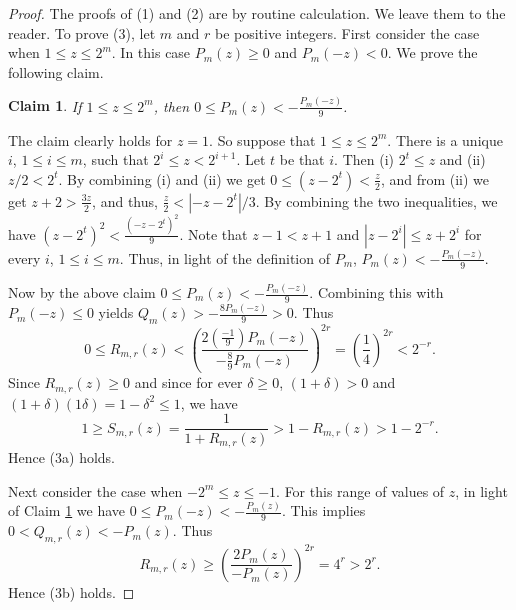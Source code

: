 \documentclass{amsbook}
\newtheorem{claim}[theorem]{Claim}
\theoremstyle{definition}
\theoremstyle{remark}
\numberwithin{section}{chapter}
\numberwithin{equation}{chapter}
\begin{document}
\begin{proof}
The proofs of (1) and (2) are by routine calculation. We leave them to the reader. To prove (3), let $m$ and $r$ be positive integers. First consider the case when $1\leq z\leq 2^m$. In this case $P_m(z)\geq 0$ and $P_m(-z)<0$. We prove the following claim.
\begin{claim}\label{plclaim1}
If $1\leq z\leq 2^m$, then  $0\leq P_m(z)<-\frac{P_m(-z)}{9}$.
\end{claim}
\begin{cproof}
The claim clearly holds for $z=1$. So suppose that $1\leq z\leq 2^m$. There is a unique $i$, $1\leq i\leq m$, such that $2^i\leq z<2^{i+1}$. Let $t$ be that $i$. Then (i) $2^t\leq z$ and (ii) $z/2<2^t$. By combining (i) and (ii) we get $0\leq (z-2^t)<\frac{z}{2}$, and from (ii) we get $z+2>\frac{3z}{2}$, and thus, $\frac{z}{2}<|-z-2^t|/3$. By combining the two inequalities, we have $(z-2^t)^2<\frac{(-z-2^t)^2}{9}$. Note that $z-1<z+1$ and $|z-2^i|\leq z+2^i$ for every $i$, $1\leq i\leq m$. Thus, in light of the definition of $P_m$, $P_m(z)<-\frac{P_m(-z)}{9}$.
\end{cproof}

Now by the above claim $0\leq P_m(z)<-\frac{P_m(-z)}{9}$. Combining this with $P_m(-z)\leq 0$ yields $Q_m(z)>-\frac{8P_m(-z)}{9}>0$. Thus
\[
0\leq R_{m,r}(z)<\left(\frac{2\left(\frac{-1}{9}\right)P_m(-z)}{-\frac{8}{9}P_m(-z)}\right)^{2r}=\left(\frac{1}{4}\right)^{2r}<2^{-r}.
\]
Since $R_{m,r}(z)\geq 0$ and since for ever $\delta\geq 0$, $(1+\delta )>0$ and $(1+\delta)(1\delta )=1-\delta^2\leq 1$, we have
\[
1\geq S_{m,r}(z)=\frac{1}{1+R_{m,r}(z)}>1-R_{m,r}(z)>1-2^{-r}.
\]
Hence (3a) holds.

Next consider the case when $-2^m\leq z\leq -1$. For this range of values of $z$, in light of Claim \ref{plclaim1} we have $0\leq P_m(-z)<-\frac{P_m(z)}{9}$. This implies $0<Q_{m,r}(z)<-P_m(z)$. Thus
\[
R_{m,r}(z)\geq \left(\frac{2P_m(z)}{-P_m(z)}\right)^{2r}=4^r>2^r.
\]
Hence (3b) holds.
\end{proof}
\end{document}
